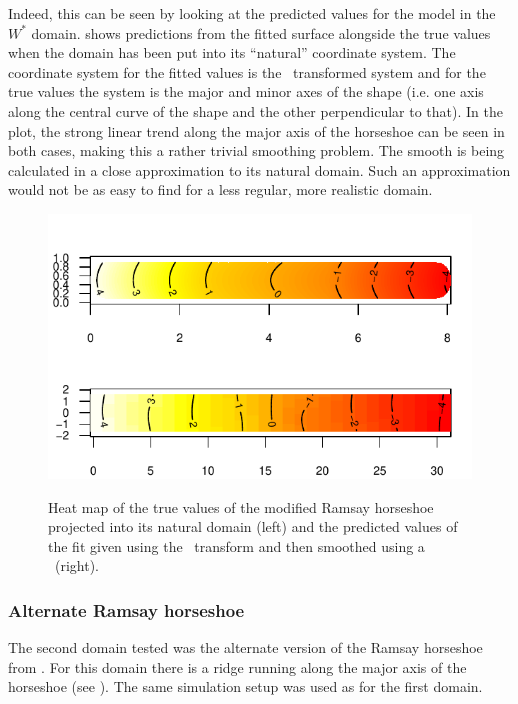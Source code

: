 Indeed, this can be seen by looking at the predicted values for the model in the $W^*$ domain.  shows predictions from the fitted surface alongside the true values when the domain has been put into its ``natural'' coordinate system. The coordinate system for the fitted values is the \sch\ transformed system and for the true values the system is the major and minor axes of the shape (i.e. one axis along the central curve of the shape and the other perpendicular to that). In the plot, the strong linear trend along the major axis of the horseshoe can be seen in both cases, making this a rather trivial smoothing problem. The smooth is being calculated in a close approximation to its natural domain. Such an approximation would not be as easy to find for a less regular, more realistic domain.

\begin{figure}
\centering
\includegraphics{sc/figs/hsvisgam.pdf} \\
\caption{Heat map of the true values of the modified Ramsay horseshoe projected into its natural domain (left) and the predicted values of the fit given using the \sch\ transform and then smoothed using a \tprs\ (right).}
\label{hsvisgam}
\end{figure}

\subsubsection{Alternate Ramsay horseshoe}
\label{sc-alt-horsehoe}
The second domain tested was the alternate version of the Ramsay horseshoe from . For this domain there is a ridge running along the major axis of the horseshoe (see ). The same simulation setup was used as for the first domain.


